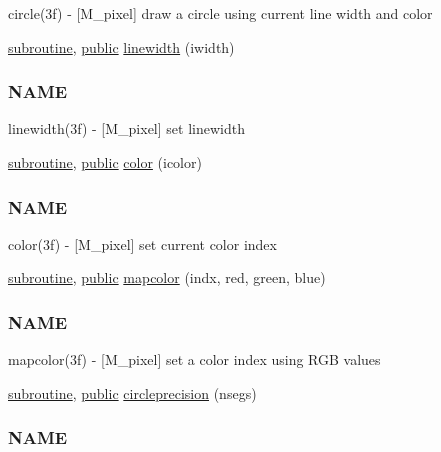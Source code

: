 \begin{DoxyCompactItemize}
\begin{DoxyCompactList}
circle(3f) -\/ \mbox{[}M\+\_\+pixel\mbox{]} draw a circle using current line width and color \end{DoxyCompactList}\item 
\hyperlink{M__stopwatch_83_8txt_acfbcff50169d691ff02d4a123ed70482}{subroutine}, \hyperlink{M__stopwatch_83_8txt_a2f74811300c361e53b430611a7d1769f}{public} \hyperlink{namespacem__pixel_a16379e283aaa99e2e0ba1eb26e93452d}{linewidth} (iwidth)
\begin{DoxyCompactList}\small\item\em \subsubsection*{N\+A\+ME}

linewidth(3f) -\/ \mbox{[}M\+\_\+pixel\mbox{]} set linewidth \end{DoxyCompactList}\item 
\hyperlink{M__stopwatch_83_8txt_acfbcff50169d691ff02d4a123ed70482}{subroutine}, \hyperlink{M__stopwatch_83_8txt_a2f74811300c361e53b430611a7d1769f}{public} \hyperlink{namespacem__pixel_a334bde41bc7b2db19b950b1271ba7463}{color} (icolor)
\begin{DoxyCompactList}\small\item\em \subsubsection*{N\+A\+ME}

color(3f) -\/ \mbox{[}M\+\_\+pixel\mbox{]} set current color index \end{DoxyCompactList}\item 
\hyperlink{M__stopwatch_83_8txt_acfbcff50169d691ff02d4a123ed70482}{subroutine}, \hyperlink{M__stopwatch_83_8txt_a2f74811300c361e53b430611a7d1769f}{public} \hyperlink{namespacem__pixel_a3422f51171f30979868a8075690da9f5}{mapcolor} (indx, red, green, blue)
\begin{DoxyCompactList}\small\item\em \subsubsection*{N\+A\+ME}

mapcolor(3f) -\/ \mbox{[}M\+\_\+pixel\mbox{]} set a color index using R\+GB values \end{DoxyCompactList}\item 
\hyperlink{M__stopwatch_83_8txt_acfbcff50169d691ff02d4a123ed70482}{subroutine}, \hyperlink{M__stopwatch_83_8txt_a2f74811300c361e53b430611a7d1769f}{public} \hyperlink{namespacem__pixel_a68ca1be8f7a92ece6efce8d69987af9c}{circleprecision} (nsegs)
\begin{DoxyCompactList}\small\item\em \subsubsection*{N\+A\+ME}


\end{DoxyCompactList}
\end{DoxyCompactItemize}
